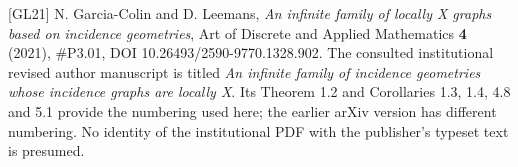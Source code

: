 {[}GL21{]} N. Garcia-Colin and D. Leemans, \emph{An infinite family of locally X graphs based on incidence geometries}, Art of Discrete and Applied Mathematics \textbf{4} (2021), \#P3.01, DOI 10.26493/2590-9770.1328.902. The consulted institutional revised author manuscript is titled \emph{An infinite family of incidence geometries whose incidence graphs are locally X}. Its Theorem 1.2 and Corollaries 1.3, 1.4, 4.8 and 5.1 provide the numbering used here; the earlier arXiv version has different numbering. No identity of the institutional PDF with the publisher's typeset text is presumed.


